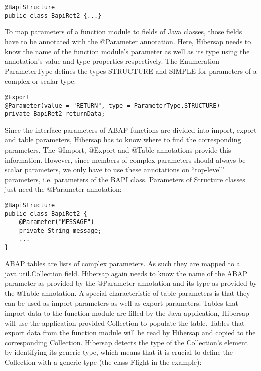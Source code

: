 \begin{Verbatim}[frame=single]
@BapiStructure 
public class BapiRet2 {...}
\end{Verbatim}

To map parameters of a function module to fields of Java classes, those fields have to be annotated with the @Parameter annotation. Here, Hibersap needs to know the name of the function module's parameter as well as its type using the annotation's value and type properties respectively. The Enumeration ParameterType defines the types STRUCTURE and SIMPLE for parameters of a complex or scalar type:

\begin{Verbatim}[frame=single]
@Export 
@Parameter(value = "RETURN", type = ParameterType.STRUCTURE) 
private BapiRet2 returnData;
\end{Verbatim}

Since the interface parameters of ABAP functions are divided into import, export and table parameters, Hibersap has to know where to find the corresponding parameters. The @Import, @Export and @Table annotations provide this information. However, since members of complex parameters should always be scalar parameters, we only have to use these annotations on ``top-level'' parameters, i.e. parameters of the BAPI class. Parameters of Structure classes just need the @Parameter annotation:

\begin{Verbatim}[frame=single]
@BapiStructure 
public class BapiRet2 {
    @Parameter("MESSAGE") 
    private String message; 
    ...
}
\end{Verbatim}

ABAP tables are lists of complex parameters. As such they are mapped to a java.util.Collection field. Hibersap again needs to know the name of the ABAP parameter as provided by the @Parameter annotation and its type as provided by the @Table annotation. A special characteristic of table parameters is that they can be used as import parameters as well as export parameters. Tables that import data to the function module are filled by the Java application, Hibersap will use the application-provided Collection to populate the table. Tables that export data from the function module will be read by Hibersap and copied to the corresponding Collection. Hibersap detects the type of the Collection's element by identifying its generic type, which means that it is crucial to define the Collection with a generic type (the class Flight in the example): 

